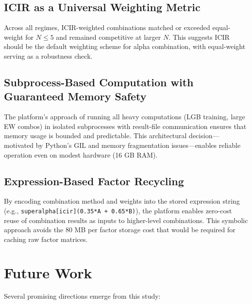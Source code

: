 \documentclass[11pt,a4paper]{ctexart}
\begin{document}
\subsection{ICIR as a Universal Weighting Metric}
Across all regimes, ICIR-weighted combinations matched or exceeded equal-weight for $N \leq 5$ and remained competitive at larger $N$. This suggests ICIR should be the default weighting scheme for alpha combination, with equal-weight serving as a robustness check.

\subsection{Subprocess-Based Computation with Guaranteed Memory Safety}
The platform's approach of running all heavy computations (LGB training, large EW combos) in isolated subprocesses with result-file communication ensures that memory usage is bounded and predictable. This architectural decision---motivated by Python's GIL and memory fragmentation issues---enables reliable operation even on modest hardware (16 GB RAM).

\subsection{Expression-Based Factor Recycling}
By encoding combination method and weights into the stored expression string (e.g., \texttt{superalpha[icir](0.35*A + 0.65*B)}), the platform enables zero-cost reuse of combination results as inputs to higher-level combinations. This symbolic approach avoids the 80 MB per factor storage cost that would be required for caching raw factor matrices.

\section{Future Work}

Several promising directions emerge from this study:
\end{document}
